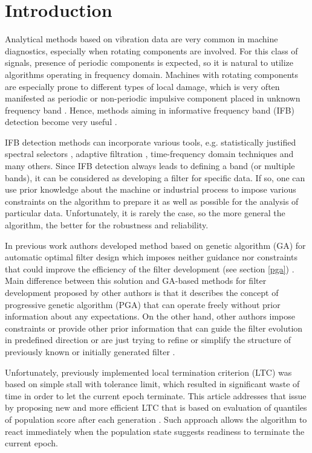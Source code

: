 \documentclass{svproc}
\begin{document}
\section{Introduction}

Analytical methods based on vibration data are very common in machine diagnostics, especially when rotating components are involved. For this class of signals, presence of periodic components is expected, so it is natural to utilize algorithms operating in frequency domain. Machines with rotating components are especially prone to different types of local damage, which is very often manifested as periodic or non-periodic impulsive component placed in unknown frequency band \cite{bartelmus2009new}. Hence, methods aiming in informative frequency band (IFB) detection become very useful \cite{obuchowski2014selection}.

IFB detection methods can incorporate various tools, e.g. statistically justified spectral selectors \cite{obuchowski2014recent,wylomanska2016impulsive,zak20161932}, adaptive filtration \cite{makowski2014new,makowski2013procedure}, time-frequency domain techniques \cite{wodecki2017novel,wylomanska2016application} and many others. Since IFB detection always leads to defining a band (or multiple bands), it can be considered as developing a filter for specific data. If so, one can use prior knowledge about the machine or industrial process to impose various constraints on the algorithm to prepare it as well as possible for the analysis of particular data. Unfortunately, it is rarely the case, so the more general the algorithm, the better for the robustness and reliability.

In previous work authors developed method based on genetic algorithm (GA) for automatic optimal filter design which imposes neither guidance nor constraints that could improve the efficiency of the filter development (see section \ref{pga}) \cite{wodecki2018optimal}. Main difference between this solution and GA-based methods for filter development proposed by other authors is that it describes the concept of progressive genetic algorithm (PGA) that can operate freely without prior information about any expectations. On the other hand, other authors impose constraints or provide other prior information that can guide the filter evolution in predefined direction \cite{nilsson2003digital} or are just trying to refine or simplify the structure of previously known or initially generated filter \cite{lee1998digital,sabbir2006design}. 

Unfortunately, previously implemented local termination criterion (LTC) was based on simple stall with tolerance limit, which resulted in significant waste of time in order to let the current epoch terminate. This article addresses that issue by proposing new and more efficient LTC that is based on evaluation of quantiles of population score after each generation \cite{langford2006quartiles}. Such approach allows the algorithm to react immediately when the population state suggests readiness to terminate the current epoch. 
\end{document}
